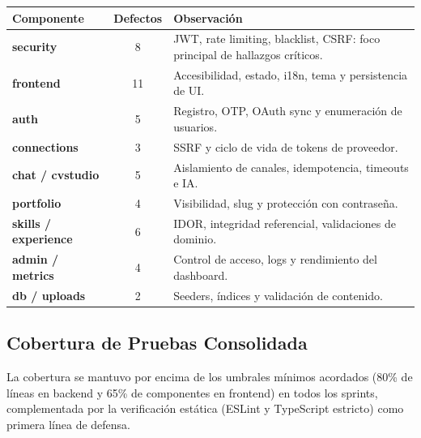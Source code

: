 \vspace{0.1cm}
\noindent
\renewcommand{\arraystretch}{1.3}
\fontsize{8.5}{10.2}\selectfont\sffamily
\begin{tabularx}{\textwidth}{|>{\ttfamily\bfseries\color{colorPrimario}}l|c|Y|}
\hline
{}
\sffamily\textbf{Componente} & \sffamily\textbf{Defectos} & \sffamily\textbf{Observación} \\
\hline
security & 8 & JWT, rate limiting, blacklist, CSRF: foco principal de hallazgos críticos. \\ \hline
{}
frontend & 11 & Accesibilidad, estado, i18n, tema y persistencia de UI. \\ \hline
auth & 5 & Registro, OTP, OAuth sync y enumeración de usuarios. \\ \hline
{}
connections & 3 & SSRF y ciclo de vida de tokens de proveedor. \\ \hline
chat / cvstudio & 5 & Aislamiento de canales, idempotencia, timeouts e IA. \\ \hline
{}
portfolio & 4 & Visibilidad, slug y protección con contraseña. \\ \hline
skills / experience & 6 & IDOR, integridad referencial, validaciones de dominio. \\ \hline
{}
admin / metrics & 4 & Control de acceso, logs y rendimiento del dashboard. \\ \hline
db / uploads & 2 & Seeders, índices y validación de contenido. \\ \hline
\end{tabularx}

\subsection{Cobertura de Pruebas Consolidada}


\vspace{0.2cm}
\noindent La cobertura se mantuvo por encima de los umbrales mínimos acordados (80\% de
líneas en backend y 65\% de componentes en frontend) en todos los sprints, complementada por
la verificación estática (ESLint y TypeScript estricto) como primera línea de defensa.

